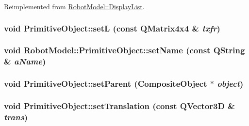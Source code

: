 Reimplemented from \hyperlink{class_robot_model_1_1_display_list_a7d52ea010f54755bcb3bfae9e26dd0c2}{RobotModel::DisplayList}.\hypertarget{class_robot_model_1_1_primitive_object_a2d5bb08b04bf39964106c981cdca7d0e}{
\subsubsection[{setL}]{\setlength{\rightskip}{0pt plus 5cm}void PrimitiveObject::setL (const QMatrix4x4 \& {\em txfr})}}
\label{class_robot_model_1_1_primitive_object_a2d5bb08b04bf39964106c981cdca7d0e}
\hypertarget{class_robot_model_1_1_primitive_object_a61c7cffdac933e1f363fa7d4715f669c}{
\subsubsection[{setName}]{\setlength{\rightskip}{0pt plus 5cm}void RobotModel::PrimitiveObject::setName (const QString \& {\em aName})}}
\label{class_robot_model_1_1_primitive_object_a61c7cffdac933e1f363fa7d4715f669c}
\hypertarget{class_robot_model_1_1_primitive_object_afdcf8007d5aebfa88356d5551afb9775}{
\subsubsection[{setParent}]{\setlength{\rightskip}{0pt plus 5cm}void PrimitiveObject::setParent ({\bf CompositeObject} $\ast$ {\em object})}}
\label{class_robot_model_1_1_primitive_object_afdcf8007d5aebfa88356d5551afb9775}
\hypertarget{class_robot_model_1_1_primitive_object_ae6c417003b52df18a52711031e95c44a}{
\subsubsection[{setTranslation}]{\setlength{\rightskip}{0pt plus 5cm}void PrimitiveObject::setTranslation (const QVector3D \& {\em trans})}}
\label{class_robot_model_1_1_primitive_object_ae6c417003b52df18a52711031e95c44a}



